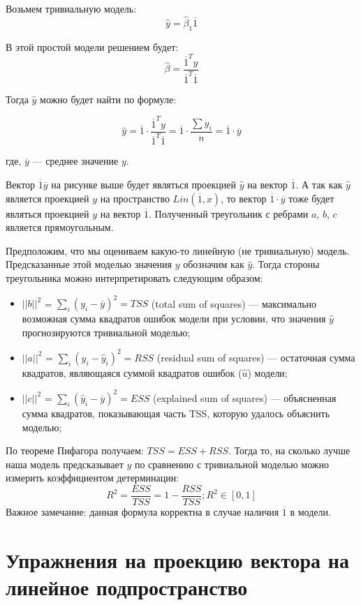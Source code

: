 \documentclass[12pt]{article} %
\theoremstyle{definition} %
\def \hb{\hat{\beta}}
\def \hy{\hat{y}}
\def \hu{\hat{u}}
\begin{document}
Возьмем тривиальную модель:
\[
\hy = \hb_1 \overline{1}
\]

В этой простой модели решением будет:
\[
\hb = \frac{\overline{1}^Ty}{\overline{1}^T\overline{1}}
\]

Тогда $\hy$ можно будет найти по формуле:

\[
\hy = \overline{1} \cdot \frac{\overline{1}^Ty}{\overline{1}^T\overline{1}} = \overline{1} \cdot \frac{\sum y_i}{n} = \overline{1} \cdot \overline{y}
\]

где, $\overline{y}$ — среднее значение $y$.

Вектор $\overline{1}\overline{y}$ на рисунке выше будет являться проекцией $\hy$ на вектор $\overline{1}$. А так как $\hy$ является проекцией $y$ на пространство $Lin(\overline{1}, x)$, то вектор $\overline{1} \cdot \overline{y}$ тоже будет являться проекцией $y$ на вектор $\overline{1}$. Полученный треугольник с ребрами $a$, $b$, $c$ является прямоугольным.

Предположим, что мы оцениваем какую-то линейную (не тривиальную) модель. Предсказанные этой моделью значения $y$ обозначим как $\hy$. Тогда стороны треугольника можно интерпретировать следующим образом:

\begin{itemize}
    \item $||b||^2$ = $\sum_i (y_i - \overline{y})^2 = TSS$ (total sum of squares) — максимально возможная сумма квадратов ошибок модели при условии, что значения $\hy$ прогнозируются тривиальной моделью;
    \item $||a||^2$ = $\sum_i (y_i - \hy_i)^2 = RSS$ (residual sum of squares) — остаточная сумма квадратов, являющаяся суммой квадратов ошибок ($\hu$) модели;
    \item $||c||^2$ = $\sum_i (\hy_i - \overline{y})^2 = ESS$ (explained sum of squares) — объясненная сумма квадратов, показывающая часть TSS, которую удалось объяснить моделью;
\end{itemize}

По теореме Пифагора получаем: $TSS = ESS + RSS$. Тогда то, на сколько лучше наша модель предсказывает $y$ по сравнению с тривиальной моделью можно измерить коэффициентом детерминации:
\[
R^2 = \frac{ESS}{TSS} = 1- \frac{RSS}{TSS};
R^2 \in [0,1]
\]
Важное замечание: данная формула корректна в случае наличия $\overline{1}$ в модели.

\section{Упражнения на проекцию вектора на линейное подпространство}
\end{document}

